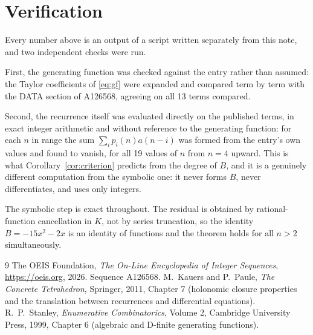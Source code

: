 \documentclass[11pt,a4paper]{article}
\theoremstyle{plain}
\theoremstyle{definition}
\begin{document}
\section{Verification}

Every number above is an output of a script written separately from this note, and two
independent checks were run.

First, the generating function was checked against the entry rather than assumed: the
Taylor coefficients of \eqref{eq:gf} were expanded and compared term by term with the DATA
section of A126568, agreeing on all 13 terms compared.

Second, the recurrence itself was evaluated directly on the published terms, in exact
integer arithmetic and without reference to the generating function: for each $n$ in range
the sum $\sum_{i}p_{i}(n)a(n-i)$ was formed from the entry's own values and found to
vanish, for all 19 values of $n$ from $n=4$ upward. This is what
Corollary~\ref{cor:criterion} predicts from the degree of $B$, and it is a genuinely
different computation from the symbolic one: it never forms $B$, never differentiates, and
uses only integers.

The symbolic step is exact throughout. The residual is obtained by rational-function
cancellation in $K$, not by series truncation, so the identity $B=- 15 x^{2} - 2 x$ is an
identity of functions and the theorem holds for all $n>2$ simultaneously.

\begin{thebibliography}{9}
 The OEIS Foundation, \emph{The On-Line Encyclopedia of Integer Sequences},
\url{https://oeis.org}, 2026. Sequence A126568.
 M.~Kauers and P.~Paule, \emph{The Concrete Tetrahedron}, Springer, 2011,
Chapter 7 (holonomic closure properties and the translation between recurrences and
differential equations).
 R.~P.~Stanley, \emph{Enumerative Combinatorics}, Volume 2, Cambridge
University Press, 1999, Chapter 6 (algebraic and D-finite generating functions).
\end{thebibliography}
\end{document}
